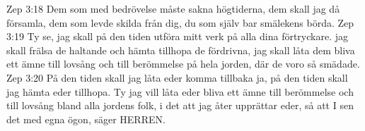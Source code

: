 Zep 3:18  Dem som med bedrövelse måste sakna högtiderna, dem skall jag då församla, dem som levde skilda från dig, du som själv bar smälekens börda.
Zep 3:19  Ty se, jag skall på den tiden utföra mitt verk på alla dina förtryckare. jag skall frälsa de haltande och hämta tillhopa de fördrivna, jag skall låta dem bliva ett ämne till lovsång och till berömmelse på hela jorden, där de voro så smädade.
Zep 3:20  På den tiden skall jag låta eder komma tillbaka ja, på den tiden skall jag hämta eder tillhopa. Ty jag vill låta eder bliva ett ämne till berömmelse och till lovsång bland alla jordens folk, i det att jag åter upprättar eder, så att I sen det med egna ögon, säger HERREN.



